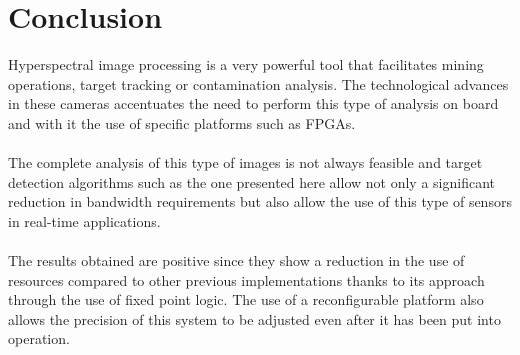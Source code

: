 \cleardoublepage
\chapter{Conclusion}
\label{makereference}
Hyperspectral image processing is a very powerful tool that facilitates mining operations, target tracking or contamination analysis. The technological advances in these cameras accentuates the need to perform this type of analysis on board and with it the use of specific platforms such as FPGAs.
\\
\\
The complete analysis of this type of images is not always feasible and target detection algorithms such as the one presented here allow not only a significant reduction in bandwidth requirements but also allow the use of this type of sensors in real-time applications.
\\
\\
The results obtained are positive since they show a reduction in the use of resources compared to other previous implementations thanks to its approach through the use of fixed point logic. The use of a reconfigurable platform also allows the precision of this system to be adjusted even after it has been put into operation.
\\